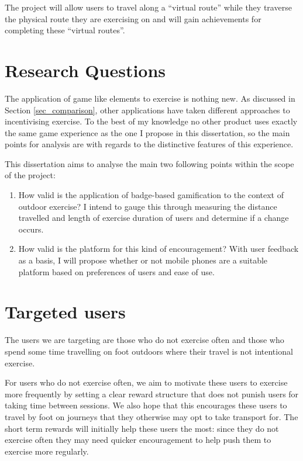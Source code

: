 The project will allow users to travel along a ``virtual route''
while they traverse the physical route they are exercising on and will
gain achievements for completing these ``virtual routes''.

\section{Research Questions}

The application of game like elements to exercise is nothing new. As
discussed in Section \ref{sec_comparison}, other applications have
taken different approaches to incentivising exercise. To the best of
my knowledge no other product uses exactly the same game experience as
the one I propose in this dissertation, so the main points for
analysis are with regards to the distinctive features of this
experience. 

This dissertation aims to analyse the main two following points within
the scope of the project:

\begin{enumerate}
  \item How valid is the application of badge-based gamification to
    the context of outdoor exercise? I intend to gauge this through
    measuring the distance travelled and length of exercise duration
    of users and determine if a change occurs.
  \item How valid is the platform for this kind of encouragement?
    With user feedback as a basis, I will propose whether or not
    mobile phones are a suitable platform based on preferences of
    users and ease of use.
\end{enumerate}


\section{Targeted users}
The users we are targeting are those who do not exercise often and
those who spend some time travelling on foot outdoors where their
travel is not intentional exercise. 

For users who do not exercise often, we aim to motivate these users to
exercise more frequently by setting a clear reward structure that does
not punish users for taking time between sessions. We also hope that
this encourages these users to travel by foot on journeys that they
otherwise may opt to take transport for. The short term rewards will
initially help these users the most: since they do not exercise
often they may need quicker encouragement to help push them to
exercise more regularly.

